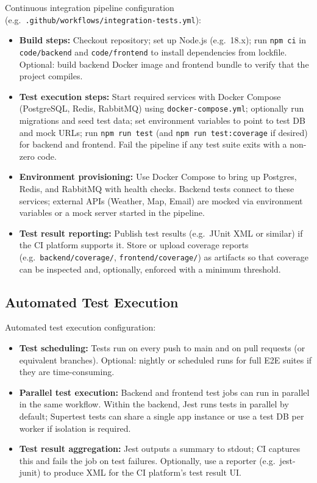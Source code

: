 Continuous integration pipeline configuration (e.g.\ \texttt{.github/workflows/integration-tests.yml}):
\begin{itemize}
    \item \textbf{Build steps:} Checkout repository; set up Node.js (e.g.\ 18.x); run \texttt{npm ci} in \texttt{code/backend} and \texttt{code/frontend} to install dependencies from lockfile. Optional: build backend Docker image and frontend bundle to verify that the project compiles.
    \item \textbf{Test execution steps:} Start required services with Docker Compose (PostgreSQL, Redis, RabbitMQ) using \texttt{docker-compose.yml}; optionally run migrations and seed test data; set environment variables to point to test DB and mock URLs; run \texttt{npm run test} (and \texttt{npm run test:coverage} if desired) for backend and frontend. Fail the pipeline if any test suite exits with a non-zero code.
    \item \textbf{Environment provisioning:} Use Docker Compose to bring up Postgres, Redis, and RabbitMQ with health checks. Backend tests connect to these services; external APIs (Weather, Map, Email) are mocked via environment variables or a mock server started in the pipeline.
    \item \textbf{Test result reporting:} Publish test results (e.g.\ JUnit XML or similar) if the CI platform supports it. Store or upload coverage reports (e.g.\ \texttt{backend/coverage/}, \texttt{frontend/coverage/}) as artifacts so that coverage can be inspected and, optionally, enforced with a minimum threshold.
\end{itemize}

\subsection{Automated Test Execution}
\label{subsec:automated_test_execution}%

Automated test execution configuration:
\begin{itemize}
    \item \textbf{Test scheduling:} Tests run on every push to main and on pull requests (or equivalent branches). Optional: nightly or scheduled runs for full E2E suites if they are time-consuming.
    \item \textbf{Parallel test execution:} Backend and frontend test jobs can run in parallel in the same workflow. Within the backend, Jest runs tests in parallel by default; Supertest tests can share a single app instance or use a test DB per worker if isolation is required.
    \item \textbf{Test result aggregation:} Jest outputs a summary to stdout; CI captures this and fails the job on test failures. Optionally, use a reporter (e.g.\ jest-junit) to produce XML for the CI platform’s test result UI.
\end{itemize}

